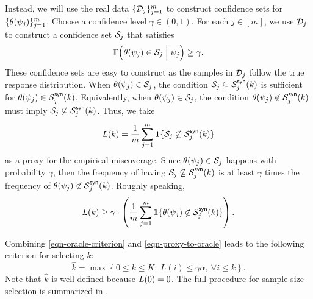 Instead, we will use the real data $\{ \mathcal{D}_j \}_{j=1}^m$ to construct confidence sets for $\{  \theta( \psi_j )  \}_{j=1}^m$. Choose a confidence level $\gamma\in(0,1)$. For each $j \in [m]$, we use $\mathcal{D}_j$ to construct a confidence set ${\mathcal{S}}_j$ that satisfies
\begin{equation}\label{eqn-CI-calibrate}
\mathbb{P}\Big( \theta ( \psi_j)  \in {\mathcal{S}}_j \Bigm| \psi_j \Big) \ge \gamma.
\end{equation}
These confidence sets are easy to construct as the samples in $\mathcal{D}_j$ follow the true response distribution. When $\theta ( \psi_j)  \in {\mathcal{S}}_j$, the condition ${\mathcal{S}}_j\subseteq {\mathcal{S}}^{\mathsf{syn}}_j(k)$ is sufficient for $\theta ( \psi_j)  \in {\mathcal{S}}^{\mathsf{syn}}_j(k)$. Equivalently, when $\theta ( \psi_j)  \in {\mathcal{S}}_j$, the condition $\theta ( \psi_j)  \not\in {\mathcal{S}}^{\mathsf{syn}}_j(k)$ must imply ${\mathcal{S}}_j\not\subseteq {\mathcal{S}}^{\mathsf{syn}}_j(k)$. Thus, we take
\begin{equation}\label{eqn-proxy}
L(k) = \frac{1}{m} \sum_{j=1}^m \operatorname{\mathbf{1}} \{ {\mathcal{S}}_j\not\subseteq {\mathcal{S}}^{\mathsf{syn}}_j(k) \}
\end{equation}
as a proxy for the empirical miscoverage. Since $\theta ( \psi_j)  \in {\mathcal{S}}_j$ happens with probability $\gamma$, then the frequency of having ${\mathcal{S}}_j\not\subseteq {\mathcal{S}}^{\mathsf{syn}}_j(k)$ is at least $\gamma$ times the frequency of $\theta ( \psi_j)  \not\in {\mathcal{S}}^{\mathsf{syn}}_j(k)$. Roughly speaking,
\begin{equation}\label{eqn-proxy-to-oracle}
L(k) \ge \gamma \cdot\left( \frac{1}{m} \sum_{j=1}^m \operatorname{\mathbf{1}} \{  \theta( \psi_j )  \not\in {\mathcal{S}}^{\mathsf{syn}}_j(k) \} \right).
\end{equation}

Combining \eqref{eqn-oracle-criterion} and \eqref{eqn-proxy-to-oracle} leads to the following criterion for selecting $k$:
\begin{equation}\label{eqn-empirical-criterion}
\widehat{k} = \max \left\{ 0\le k \le K : ~ L(i) \le \gamma\alpha, ~\forall i\le k \right\}.
\end{equation}
Note that $\widehat{k}$ is well-defined because $L(0) = 0$. The full procedure for sample size selection is summarized in . 

